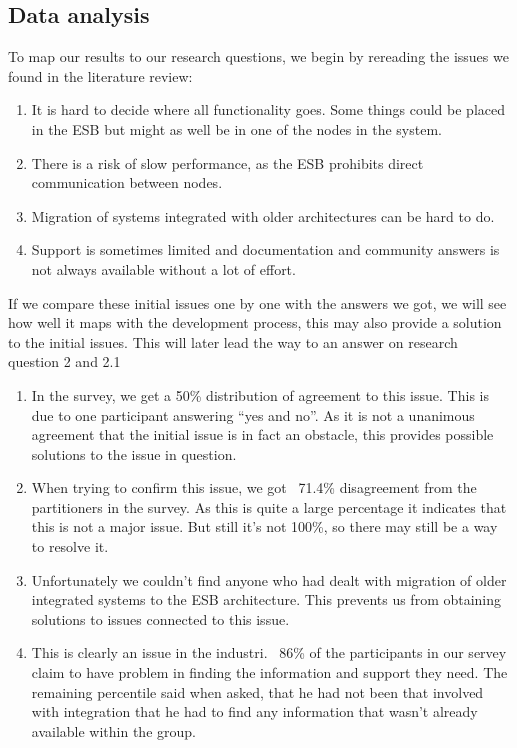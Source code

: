 \documentclass{llncs}
\begin{document}
\subsection{Data analysis}

To map our results to our research questions, we begin by rereading the issues we found in the literature review:

\begin{enumerate}
\item It is hard to decide where all functionality goes. Some things could be placed in the ESB but might as well be in one of the nodes in the system.
\item There is a risk of slow performance, as the ESB prohibits direct communication between nodes.
\item Migration of systems integrated with older architectures can be hard to do.
\item Support is sometimes limited and documentation and community answers is not always available without a lot of effort.
\end{enumerate}

If we compare these initial issues one by one with the answers we got, we will see how well it maps with the development process, this may also provide a solution to the initial issues. This will later lead the way to an answer on research question 2 and 2.1

\begin{enumerate}
\item In the survey, we get a 50\% distribution of agreement to this issue. This is due to one participant answering “yes and no”. As it is not a unanimous agreement that the initial issue is in fact an obstacle, this provides possible solutions to the issue in question.
\item When trying to confirm this issue, we got ~71.4\% disagreement from the partitioners in the survey. As this is quite a large percentage it indicates that this is not a major issue. But still it’s not 100\%, so there may still be a way to resolve it.
\item Unfortunately we couldn’t find anyone who had dealt with migration of older integrated systems to the ESB architecture. This prevents us from obtaining solutions to issues connected to this issue.
\item This is clearly an issue in the industri. ~86\% of the participants in our servey claim to have problem in finding the information and support they need. The remaining percentile said when asked, that he had not been that involved with integration that he had to find any information that wasn't already available within the group.
\end{enumerate}
\end{document}
